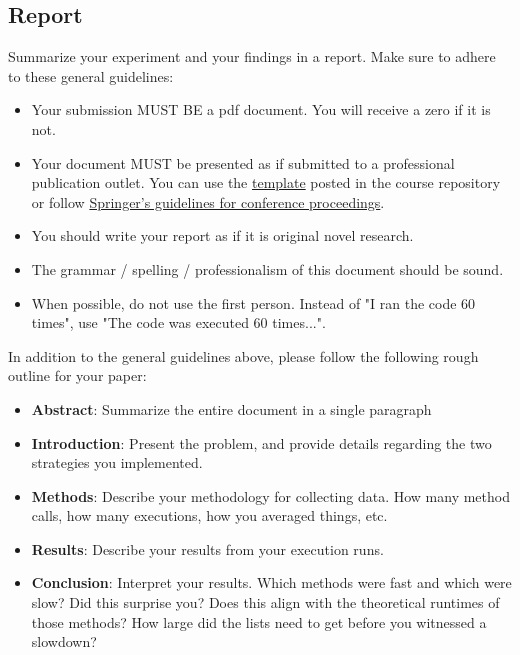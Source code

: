 \documentclass[paper=a4, fontsize=11pt, parskip=full]{scrartcl} %
\numberwithin{equation}{section} %
\numberwithin{figure}{section} %
\numberwithin{table}{section} %
\begin{document}
\subsection{Report}

Summarize your experiment and your findings in a report. Make sure to adhere to these general guidelines:

\begin{itemize}
	\item Your submission MUST BE a pdf document. You will receive a zero if it is not.
	\item Your document MUST be presented as if submitted to a professional publication outlet. You can use the \href{https://uva-cs.github.io/dsa1/homeworks/WordPaperTemplate.zip}{template} posted in the course repository or follow \href{https://www.springer.com/us/computer-science/lncs/conference-proceedings-guidelines}{Springer's guidelines for conference proceedings}.
	\item You should write your report as if it is original novel research.
	\item The grammar / spelling / professionalism of this document should be sound.
	\item When possible, do not use the first person. Instead of "I ran the code 60 times", use "The code was executed 60 times...".
\end{itemize}

In addition to the general guidelines above, please follow the following rough outline for your paper:

\begin{itemize}
	\item \textbf{Abstract}: Summarize the entire document in a single paragraph
	\item \textbf{Introduction}: Present the problem, and provide details regarding the two strategies you implemented.
	\item \textbf{Methods}: Describe your methodology for collecting data. How many method calls, how many executions, how you averaged things, etc.
	\item \textbf{Results}: Describe your results from your execution runs.
	\item \textbf{Conclusion}: Interpret your results. Which methods were fast and which were slow? Did this surprise you? Does this align with the theoretical runtimes of those methods? How large did the lists need to get before you witnessed a slowdown?
\end{itemize}
\end{document}
